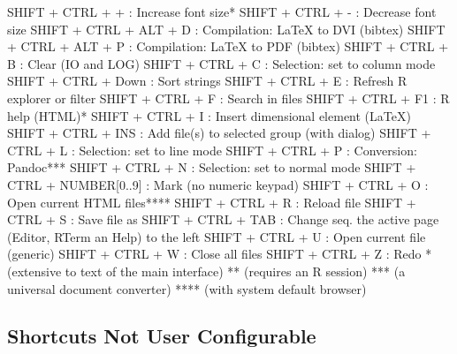 \begin{Rtables}[caption={[SHIFT + keyboard shortcuts]
    SHIFT + keyboard shortcuts},
  label=shortcut:shiftplus]
  SHIFT + CTRL + +            : Increase font size*
  SHIFT + CTRL + -            : Decrease font size
  SHIFT + CTRL + ALT + D      : Compilation: LaTeX to DVI (bibtex)
  SHIFT + CTRL + ALT + P      : Compilation: LaTeX to PDF (bibtex)
  SHIFT + CTRL + B            : Clear (IO and LOG)
  SHIFT + CTRL + C            : Selection: set to column mode
  SHIFT + CTRL + Down         : Sort strings
  SHIFT + CTRL + E            : Refresh R explorer or filter
  SHIFT + CTRL + F            : Search in files
  SHIFT + CTRL + F1           : R help (HTML)*
  SHIFT + CTRL + I            : Insert dimensional element (LaTeX)
  SHIFT + CTRL + INS          : Add file(s) to selected group (with dialog)
  SHIFT + CTRL + L            : Selection: set to line mode
  SHIFT + CTRL + P            : Conversion: Pandoc***
  SHIFT + CTRL + N            : Selection: set to normal mode
  SHIFT + CTRL + NUMBER[0..9] : Mark (no numeric keypad)
  SHIFT + CTRL + O            : Open current HTML files****
  SHIFT + CTRL + R            : Reload file
  SHIFT + CTRL + S            : Save file as
  SHIFT + CTRL + TAB          : Change seq. the active page
                                (Editor, RTerm an Help) to the left
  SHIFT + CTRL + U            : Open current file (generic)
  SHIFT + CTRL + W            : Close all files
  SHIFT + CTRL + Z            : Redo
  *    (extensive to text of the main interface)
  **   (requires an R session)
  ***  (a universal document converter)
  **** (with system default browser)
\end{Rtables}

\newpage
\subsection{Shortcuts Not User Configurable}

\vspace{-0.5cm}
